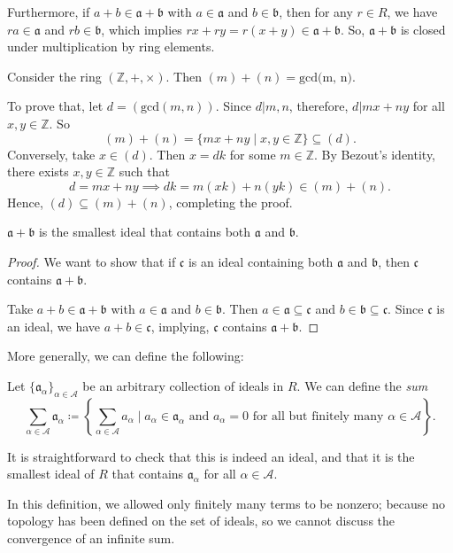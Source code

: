     Furthermore, if \(a + b \in \mathfrak{a} + \mathfrak{b}\) with \(a \in \mathfrak{a}\) and \(b \in \mathfrak{b}\), then for any \(r \in R\), we have \(ra \in \mathfrak{a}\) and \(rb \in \mathfrak{b}\), which implies \(rx + ry = r(x+y) \in \mathfrak{a} + \mathfrak{b}\). So, \(\mathfrak{a} + \mathfrak{b}\) is closed under multiplication by ring elements.
    \begin{example}\label{example:mplusnequalgcd}
    Consider the ring \((\mathbb{Z}, +, \times)\). Then \((m) + (n) = \text{gcd(m, n)}\).

    To prove that, let \(d = (\text{gcd}(m,n))\). Since \(d | m, n\), therefore, \(d | mx + ny\) for all \(x, y \in \mathbb{Z}\). So \[(m) + (n) = \{mx + ny \mid x, y \in \mathbb{Z}\} \subseteq (d).\]
    Conversely, take \(x \in (d)\). Then \(x = dk\) for some \(m \in \mathbb{Z}\). By Bezout's identity, there exists \(x, y \in \mathbb{Z}\) such that \[d = mx + ny \implies dk = m(xk) + n(yk) \in (m)+(n).\]
    Hence, \((d) \subseteq (m) + (n)\), completing the proof.
\end{example}
\begin{proposition}
    \(\mathfrak{a}+\mathfrak{b}\) is the smallest ideal that contains both \(\mathfrak{a}\) and \(\mathfrak{b}\).
\end{proposition}
\begin{proof}
    We want to show that if \(\mathfrak{c}\) is an ideal containing both \(\mathfrak{a}\) and \(\mathfrak{b}\), then \(\mathfrak{c}\) contains \(\mathfrak{a}+\mathfrak{b}\).

    Take \(a + b \in \mathfrak{a} + \mathfrak{b}\) with \(a \in \mathfrak{a}\) and \(b \in \mathfrak{b}\). Then \(a \in \mathfrak{a} \subseteq \mathfrak{c}\) and \(b \in \mathfrak{b} \subseteq \mathfrak{c}\). Since \(\mathfrak{c}\) is an ideal, we have \(a+b \in \mathfrak{c}\), implying, \(\mathfrak{c}\) contains \(\mathfrak{a}+\mathfrak{b}\).
\end{proof}
More generally, we can define the following:
\begin{definition}
    Let \(\{\mathfrak{a}_\alpha\}_{\alpha \in \mathcal{A}}\) be an arbitrary collection of ideals in \(R\). We can define the \emph{sum}
    \[\sum_{\alpha \in \mathcal{A}} \mathfrak{a}_\alpha \coloneq \left\{\sum_{\alpha \in \mathcal{A}} a_\alpha \mid a_\alpha \in \mathfrak{a}_\alpha \text{ and } a_\alpha = 0 \text{ for all but finitely many } \alpha \in \mathcal{A}\right\}.\]
\end{definition}
It is straightforward to check that this is indeed an ideal, and that it is the smallest ideal of \(R\) that contains \(\mathfrak{a}_\alpha\) for all \(\alpha \in \mathcal{A}\).
\begin{remark}
In this definition, we allowed only finitely many terms to be nonzero; because no topology has been defined on the set of ideals, so we cannot discuss the convergence of an infinite sum.
\end{remark}


